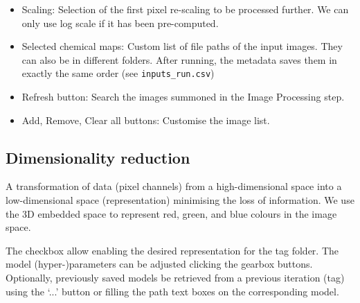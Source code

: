 	\begin{itemize}
		
		\item Scaling: Selection of the first pixel re-scaling to be processed further. We can only use log scale if it has been pre-computed.
		\item Selected chemical maps: Custom list of file paths of the input images. They can also be in different folders. After running, the metadata saves them in exactly the same order (see \texttt{inputs\_run.csv}) 
		\item Refresh button: Search the images summoned in the Image Processing step.
		\item Add, Remove, Clear all buttons: Customise the image list.
		
	\end{itemize}
	
	\subsection{Dimensionality reduction}
	
	A transformation of data (pixel channels) from a high-dimensional space into a low-dimensional space (representation) minimising the loss of information. We use the 3D embedded space to represent red, green, and blue colours in the image space. 
	
	The checkbox allow enabling the desired representation for the tag folder. The model (hyper-)parameters can be adjusted clicking the gearbox buttons. Optionally, previously saved models be retrieved from a previous iteration (tag) using the `...' button or filling the path text boxes on the corresponding model.
	
